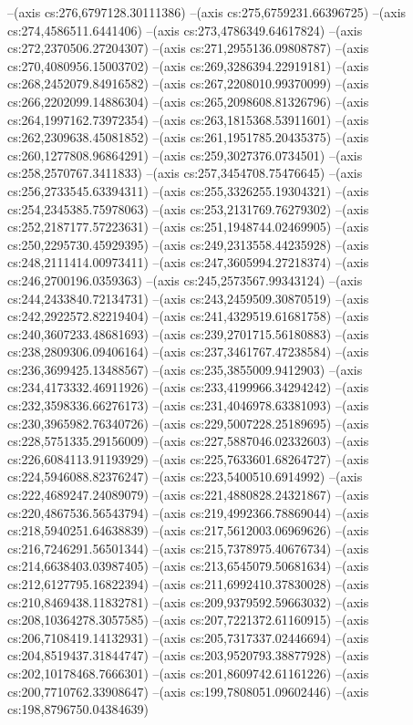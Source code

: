 --(axis cs:276,6797128.30111386)
--(axis cs:275,6759231.66396725)
--(axis cs:274,4586511.6441406)
--(axis cs:273,4786349.64617824)
--(axis cs:272,2370506.27204307)
--(axis cs:271,2955136.09808787)
--(axis cs:270,4080956.15003702)
--(axis cs:269,3286394.22919181)
--(axis cs:268,2452079.84916582)
--(axis cs:267,2208010.99370099)
--(axis cs:266,2202099.14886304)
--(axis cs:265,2098608.81326796)
--(axis cs:264,1997162.73972354)
--(axis cs:263,1815368.53911601)
--(axis cs:262,2309638.45081852)
--(axis cs:261,1951785.20435375)
--(axis cs:260,1277808.96864291)
--(axis cs:259,3027376.0734501)
--(axis cs:258,2570767.3411833)
--(axis cs:257,3454708.75476645)
--(axis cs:256,2733545.63394311)
--(axis cs:255,3326255.19304321)
--(axis cs:254,2345385.75978063)
--(axis cs:253,2131769.76279302)
--(axis cs:252,2187177.57223631)
--(axis cs:251,1948744.02469905)
--(axis cs:250,2295730.45929395)
--(axis cs:249,2313558.44235928)
--(axis cs:248,2111414.00973411)
--(axis cs:247,3605994.27218374)
--(axis cs:246,2700196.0359363)
--(axis cs:245,2573567.99343124)
--(axis cs:244,2433840.72134731)
--(axis cs:243,2459509.30870519)
--(axis cs:242,2922572.82219404)
--(axis cs:241,4329519.61681758)
--(axis cs:240,3607233.48681693)
--(axis cs:239,2701715.56180883)
--(axis cs:238,2809306.09406164)
--(axis cs:237,3461767.47238584)
--(axis cs:236,3699425.13488567)
--(axis cs:235,3855009.9412903)
--(axis cs:234,4173332.46911926)
--(axis cs:233,4199966.34294242)
--(axis cs:232,3598336.66276173)
--(axis cs:231,4046978.63381093)
--(axis cs:230,3965982.76340726)
--(axis cs:229,5007228.25189695)
--(axis cs:228,5751335.29156009)
--(axis cs:227,5887046.02332603)
--(axis cs:226,6084113.91193929)
--(axis cs:225,7633601.68264727)
--(axis cs:224,5946088.82376247)
--(axis cs:223,5400510.6914992)
--(axis cs:222,4689247.24089079)
--(axis cs:221,4880828.24321867)
--(axis cs:220,4867536.56543794)
--(axis cs:219,4992366.78869044)
--(axis cs:218,5940251.64638839)
--(axis cs:217,5612003.06969626)
--(axis cs:216,7246291.56501344)
--(axis cs:215,7378975.40676734)
--(axis cs:214,6638403.03987405)
--(axis cs:213,6545079.50681634)
--(axis cs:212,6127795.16822394)
--(axis cs:211,6992410.37830028)
--(axis cs:210,8469438.11832781)
--(axis cs:209,9379592.59663032)
--(axis cs:208,10364278.3057585)
--(axis cs:207,7221372.61160915)
--(axis cs:206,7108419.14132931)
--(axis cs:205,7317337.02446694)
--(axis cs:204,8519437.31844747)
--(axis cs:203,9520793.38877928)
--(axis cs:202,10178468.7666301)
--(axis cs:201,8609742.61161226)
--(axis cs:200,7710762.33908647)
--(axis cs:199,7808051.09602446)
--(axis cs:198,8796750.04384639)
